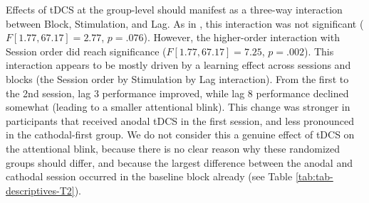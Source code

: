 \documentclass[11pt,]{memoir}
\begin{document}
\normalsize

Effects of tDCS at the group-level should manifest as a three-way interaction between Block, Stimulation, and Lag. As in \textcite{London2015}, this interaction was not significant (\(F[1.77, 67.17] = 2.77\), \(p = .076\)). However, the higher-order interaction with Session order did reach significance (\(F[1.77, 67.17] = 7.25\), \(p = .002\)). This interaction appears to be mostly driven by a learning effect across sessions and blocks (the Session order by Stimulation by Lag interaction). From the first to the 2nd session, lag 3 performance improved, while lag 8 performance declined somewhat (leading to a smaller attentional blink). This change was stronger in participants that received anodal tDCS in the first session, and less pronounced in the cathodal-first group. We do not consider this a genuine effect of tDCS on the attentional blink, because there is no clear reason why these randomized groups should differ, and because the largest difference between the anodal and cathodal session occurred in the baseline block already (see Table \ref{tab:tab-descriptives-T2}).

\small
\end{document}
